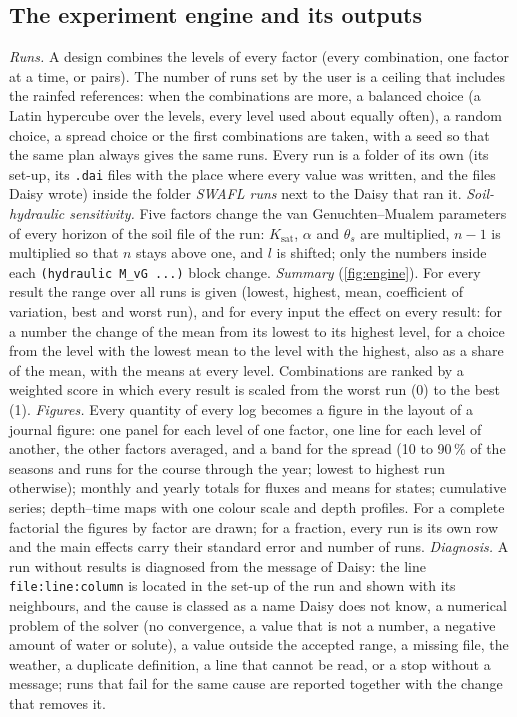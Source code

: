 \subsection{The experiment engine and its outputs}\label{sec:engine}
\emph{Runs.} A design combines the levels of every factor (every combination, one factor at a time, or pairs). The number of runs set by the user is a ceiling that includes the rainfed references: when the combinations are more, a balanced choice (a Latin hypercube over the levels, every level used about equally often), a random choice, a spread choice or the first combinations are taken, with a seed so that the same plan always gives the same runs. Every run is a folder of its own (its set-up, its \texttt{.dai} files with the place where every value was written, and the files Daisy wrote) inside the folder \emph{SWAFL runs} next to the Daisy that ran it.
\emph{Soil-hydraulic sensitivity.} Five factors change the van Genuchten--Mualem parameters of every horizon of the soil file of the run: $K_\mathrm{sat}$, $\alpha$ and $\theta_s$ are multiplied, $n-1$ is multiplied so that $n$ stays above one, and $l$ is shifted; only the numbers inside each \texttt{(hydraulic M\_vG ...)} block change.
\emph{Summary} (\cref{fig:engine}). For every result the range over all runs is given (lowest, highest, mean, coefficient of variation, best and worst run), and for every input the effect on every result: for a number the change of the mean from its lowest to its highest level, for a choice from the level with the lowest mean to the level with the highest, also as a share of the mean, with the means at every level. Combinations are ranked by a weighted score in which every result is scaled from the worst run (0) to the best (1).
\emph{Figures.} Every quantity of every log becomes a figure in the layout of a journal figure: one panel for each level of one factor, one line for each level of another, the other factors averaged, and a band for the spread (10 to 90\,\% of the seasons and runs for the course through the year; lowest to highest run otherwise); monthly and yearly totals for fluxes and means for states; cumulative series; depth--time maps with one colour scale and depth profiles. For a complete factorial the figures by factor are drawn; for a fraction, every run is its own row and the main effects carry their standard error and number of runs.
\emph{Diagnosis.} A run without results is diagnosed from the message of Daisy: the line \texttt{file:line:column} is located in the set-up of the run and shown with its neighbours, and the cause is classed as a name Daisy does not know, a numerical problem of the solver (no convergence, a value that is not a number, a negative amount of water or solute), a value outside the accepted range, a missing file, the weather, a duplicate definition, a line that cannot be read, or a stop without a message; runs that fail for the same cause are reported together with the change that removes it.

